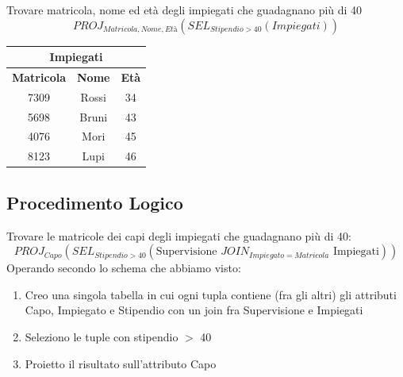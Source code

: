 \documentclass[../main.tex]{subfiles}
\begin{document}
	Trovare matricola, nome ed età degli impiegati che guadagnano più di 40
	\[PROJ_{Matricola, Nome, \textit{Età}} (SEL_{Stipendio > 40} (Impiegati))\]
	\begin{center}
		\begin{tabular}{ |c|c|c| }
			\hline
			\multicolumn{3}{|c|}{Impiegati}\\
			\hline
			\textbf{Matricola} & \textbf{Nome} & \textbf{Età}\\
			\hline
			7309 & Rossi & 34\\
			5698 & Bruni & 43\\
			4076 & Mori & 45\\
			8123 & Lupi & 46\\
			\hline
		\end{tabular}
	\end{center}
	\subsection{Procedimento Logico}
	Trovare le matricole dei capi degli impiegati che guadagnano più di 40:
	\[PROJ_{Capo} ( SEL_{Stipendio>40} ( \text{Supervisione } JOIN_{Impiegato = Matricola} \text{ Impiegati} ) )\]
	Operando secondo lo schema che abbiamo visto:
	\begin{enumerate}
		\item Creo una singola tabella in cui ogni tupla contiene (fra gli altri) gli attributi Capo, Impiegato e Stipendio con un join fra Supervisione e Impiegati
		\item Seleziono le tuple con stipendio $>$ 40
		\item Proietto il risultato sull'attributo Capo
	\end{enumerate}
\end{document}
